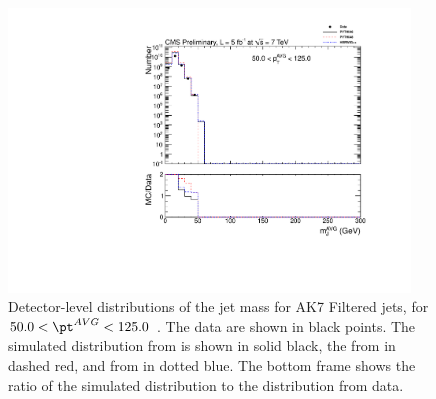 \fi

\clearpage

\ifnpas


\begin{figure}[htbp]
\centering
\includegraphics[width=0.95\textwidth]{figs/histAK7MjetVsPtAvg_rawDataMCComparisons_pt_1_Filtered}
\caption{Detector-level distributions of the jet mass for AK7 Filtered jets,
for $50.0 < \pt^{AVG} < 125.0$ \GeVc. The data are shown in black points.
The simulated distribution from \PYTHIA is shown in solid black, 
the from \PYTHIAEIGHT in dashed red, and from \HERWIG in dotted blue. 
The bottom frame shows the ratio of the simulated distribution
to the distribution from data. 
\label{figs:histAK7MjetVsPtAvg_rawDataMCComparisons_pt_1_Filtered}}
\end{figure}

\fi

